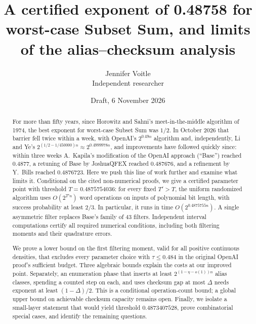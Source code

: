 \documentclass[11pt]{article}
\theoremstyle{plain}
\begin{document}
\title{A certified exponent of 0.48758 for worst-case Subset Sum, and limits of the alias--checksum analysis}
\author{Jennifer Voitle\\ Independent researcher}
\date{Draft, 6 November 2026}

\maketitle

\begin{abstract}
For more than fifty years, since Horowitz and Sahni's meet-in-the-middle algorithm of 1974, the best exponent for worst-case Subset Sum was $1/2$. In October 2026 that barrier fell twice within a week, with OpenAI's $2^{0.49n}$ algorithm and, independently, Li and Ye's $2^{(1/2 - 1/450000)n} \approx 2^{0.4999978n}$, and improvements have followed quickly since: within three weeks A.~Kapila's modification of the OpenAI approach (``Base'') reached 0.4877, a retuning of Base by JoshuaQFEX reached 0.487676, and a refinement by Y.~Bills reached 0.4876723. Here we push this line of work further and examine what limits it. Conditional on the cited non-numerical proofs, we give a certified parameter point with threshold $T=0.4875754036$: for every fixed $T'>T$, the uniform randomized algorithm uses $O(2^{T'n})$ word operations on inputs of polynomial bit length, with success probability at least $2/3$. In particular, it runs in time $O(2^{0.4875755n})$. A single asymmetric filter replaces Base's family of 43 filters. Independent interval computations certify all required numerical conditions, including both filtering moments and their quadrature errors.

We prove a lower bound on the first filtering moment, valid for all positive continuous densities, that excludes every parameter choice with $\tau\le0.484$ in the original OpenAI proof's sufficient budget. Three algebraic bounds explain the costs at our improved point. Separately, an enumeration phase that inserts at least $2^{(1-\eta-o(1))n}$ alias classes, spending a counted step on each, and uses checksum gap at most $\Delta$ needs exponent at least $(1-\Delta)/2$. This is a conditional operation-count bound; a global upper bound on achievable checksum capacity remains open. Finally, we isolate a small-layer statement that would yield threshold $0.4873407528$, prove combinatorial special cases, and identify the remaining questions.
\end{abstract}

\end{document}
